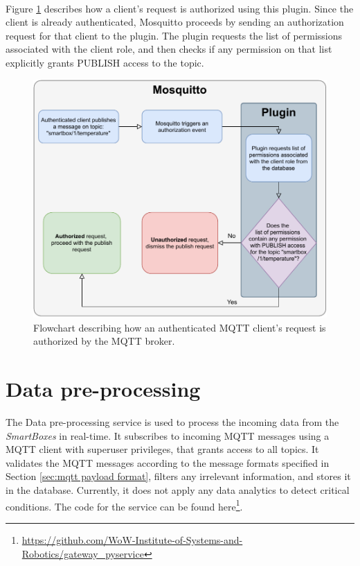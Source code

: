 \paragraph{} Figure \ref{fig:mqtt-plugin-authzflow} describes how a client's request is authorized using this plugin. Since the client is already authenticated, Mosquitto proceeds by sending an authorization request for that client to the plugin. The plugin requests the list of permissions associated with the client role, and then checks if any permission on that list explicitly grants PUBLISH access to the topic.

\begin{figure}[H]
    \centering
    \includegraphics[width=0.7\linewidth]{images/mqtt authorization.pdf}
    \caption{Flowchart describing how an authenticated \acs{MQTT} client's request is authorized by the \acs{MQTT} broker.}
    \label{fig:mqtt-plugin-authzflow}
\end{figure}
\section{Data pre-processing}

The Data pre-processing service is used to process the incoming data from the \textit{SmartBoxes} in real-time. It subscribes to incoming \acs{MQTT} messages using a \acs{MQTT} client with superuser privileges, that grants access to all topics. It validates the \acs{MQTT} messages according to the message formats specified in Section \ref{sec:mqtt payload format}, filters any irrelevant information, and stores it in the database. Currently, it does not apply any data analytics to detect critical conditions. The code for the service can be found here\footnote{\url{https://github.com/WoW-Institute-of-Systems-and-Robotics/gateway_pyservice}}. 

